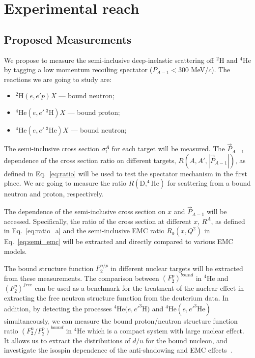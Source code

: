 \chapter{Experimental reach}
\label{chap:reach}

\section{Proposed Measurements}

We propose to measure the semi-inclusive deep-inelastic scattering off  $^2$H and $^4$He by tagging a low momentum recoiling spectator ($P_{A-1}<300$ MeV/$c$). The reactions we are going to study are:
\begin{itemize}
\item $^2$H$(e, e' p)X$ --- bound neutron;
\item $^4$He$(e, e'~^3\mathrm{H})X$ --- bound proton;
\item $^4$He$(e, e'~^3\mathrm{He})X$ --- bound neutron;
\end{itemize}
 
The semi-inclusive cross section $\sigma_1^A$ for each target will be measured. The $\vec P_{A-1}$ dependence of the cross section ratio on different targets, $R(A,A',|\vec P_{A-1}|)$, as defined in Eq.~\ref{eq:ratio} will be used to test the spectator mechanism in the first place. We are going to measure the ratio $R(\mathrm{D},^4\mathrm{He})$ for scattering from a bound neutron and proton, respectively.

The dependence of the semi-inclusive cross section on $x$ and $\vec P_{A-1}$ will be accessed. Specifically, the ratio of the cross section at different $x$, $R^A$, as defined in Eq.~\ref{eq:ratio_a} and the semi-inclusive EMC ratio $R_0 (x,Q^2)$ in Eq.~\ref{eq:semi_emc} will be extracted and directly compared to various EMC models.

The bound structure function $F_2^{n/p}$ in different nuclear targets will be extracted from these measurements. The comparison between $(F_2^{p})^{bound}$ in $^4$He and $(F_2^p)^{free}$ can be used as a benchmark for the treatment of the nuclear effect in extracting the free neutron structure function from the deuterium data. In addition, by detecting the processes $^4$He$(e,e'^3\mathrm{H)}$ and $^4$He$(e,e'^3\mathrm{He})$ simultaneously, we can measure the bound proton/neutron structure function ratio $(F_2^n/F_2^p)^{bound}$ in $^4$He which is a compact system with large nuclear effect. It allows us to extract the distributions of $d/u$ for the bound nucleon, and investigate the isospin dependence of the anti-shadowing and EMC effects~\cite{Brodsky:2004qa,Cloet2009}.

